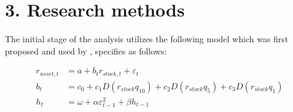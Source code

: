 \documentclass[preprint,authoryear,11pt]{elsarticle}
\begin{document}
\section{3. Research methods}
\label{sec:methods}
\noindent The initial stage of the analysis utilizes the following model which was first proposed and used by \citet{baur_is_2010}, specifies as follows:

\begin{align}
	 r_{asset,t} &= a + b_{t}r_{stock,t} + \varepsilon_{t} \label{eq:mean_equation}\\
	 b_{t} &= c_{0} + c_{1}D(r_{stock}q_{10}) + c_{2}D(r_{stock}q_{5}) + c_{3}D(r_{stock}q_{1}) \label{eq:bt}\\
	 h_{t} &= \omega + \alpha\varepsilon_{t-1}^2 + \beta h_{t-1} \label{eq:garch11}
\end{align}
\end{document}
